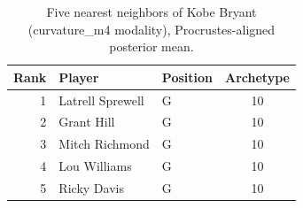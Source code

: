 \begin{table}[htbp]
  \centering\small
  \begin{tabular}{rllc}
    \toprule
    Rank & Player & Position & Archetype \\
    \midrule
    1 & Latrell Sprewell & G & 10 \\
    2 & Grant Hill & G & 10 \\
    3 & Mitch Richmond & G & 10 \\
    4 & Lou Williams & G & 10 \\
    5 & Ricky Davis & G & 10 \\
    \bottomrule
  \end{tabular}
  \caption{Five nearest neighbors of Kobe Bryant (curvature_m4 modality), Procrustes-aligned posterior mean.}
  \label{tab:Kobe_Bryant_neighbors_curvature_m4}
\end{table}

